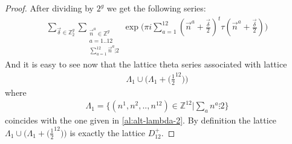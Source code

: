 \documentclass{article}
\newcommand{\ZZ}{\mathbb{Z}}
\newcommand{\de}{\delta}
\theoremstyle{plain}
\theoremstyle{definition}
\begin{document}
\begin{proof}
        After dividing by $2^g$ we get the following series:
        \begin{align}\label{al:alt-lambda-2}
            \sum_{{\vec{\de}} \in \ZZ_2^g} \sum_{\substack{\vec n^a \in \ZZ^g \\ a=1..12 \\ \sum_{a=1}^{12} \vec n^a \vdots 2}}
                \exp \Big(
                    \pi i \sum_{a=1}^{12}
                        (\vec n^a + \frac{{\vec{\de}}}{2})^t \tau
                        (\vec n^a + \frac{{\vec{\de}}}{2})
                \Big)
        \end{align}
        And it is easy to see now that the lattice theta series associated with lattice
        \begin{align}
            \Lambda_1 \cup \Big(\Lambda_1 + \big(\frac{1}{2}^{12}\big)\Big)
        \end{align}
        where 
        \begin{align}
            \Lambda_1 = \{ 
                (n^1, n^2, .., n^{12}) \in \ZZ^{12} |
                \sum_a n^a \vdots 2
            \}
        \end{align}
        coincides with the one given in \eqref{al:alt-lambda-2}.
        By definition the lattice $\Lambda_1 \cup \big(\Lambda_1+\big(\frac{1}{2}^{12}\big)\big)$
        is exactly the lattice $D_{12}^+$.
    \end{proof}
\end{document}
